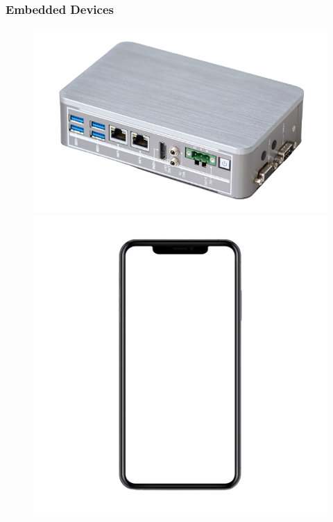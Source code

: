 \documentclass{beamer}
\begin{document}
\begin{frame}
  \frametitle{Embedded Devices}

  \begin{figure}
    \centering
    \includegraphics[scale=0.21]{images/edge-pc}
    \includegraphics[scale=0.17]{images/smart-phone}

\end{figure}
\end{frame}
\end{document}
